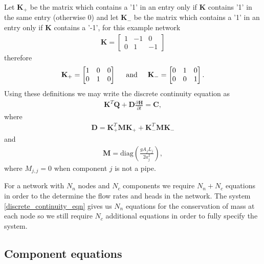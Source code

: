 \documentclass[12pt]{article}
\newcommand{\pardiv}[3]{\frac{\partial^{#1} #2}{\partial #3^{#1}}}
\begin{document}
Let $\mathbf{K}_+$ be the matrix which contains a '1' in an entry only if $\mathbf{K}$ contains '1' in the same entry (otherwise 0) and let $\mathbf{K}_-$ be the matrix which contains a '1' in an entry only if $\mathbf{K}$ contains a '-1', for this example network 
\begin{align*}
\mathbf{K} = \begin{bmatrix}
1 & -1 & 0 \\
0 & 1 & -1
\end{bmatrix}
\end{align*}
therefore
\begin{align*}
\mathbf{K}_+ = \begin{bmatrix}
1 & 0 & 0 \\
0 & 1 & 0
\end{bmatrix}
\hspace{0.5cm} \text{and} \hspace{0.5cm} \mathbf{K}_- = \begin{bmatrix}
0 & 1 & 0 \\
0 & 0 & 1
\end{bmatrix}.
\end{align*}
Using these definitions we may write the discrete continuity equation as 
\begin{align}\label{discrete_continuity_eqn}
\boxed{\mathbf{K}^T \mathbf{Q} + \mathbf{D} \pardiv{}{\mathbf{H}}{t} = \mathbf{C},}
\end{align}
where 
\begin{align*}
\mathbf{D} = \mathbf{K}_+^T \mathbf{M} \mathbf{K}_+ + \mathbf{K}_-^T \mathbf{M} \mathbf{K}_-
\end{align*}
and
\begin{align*}
\mathbf{M} = \text{diag}\left( \frac{gA_j L_j}{2 a_j^2}\right),
\end{align*}
{\color{red}where $M_{j,j} = 0$ when component $j$ is not a pipe.}

For a network with $N_n$ nodes and $N_c$ components we require $N_n + N_c$ equations in order to the determine the flow rates and heads in the network. The system \eqref{discrete_continuity_eqn} gives us $N_n$ equations for the conservation of mass at each node so we still require $N_c$ additional equations in order to fully specify the system. 

\subsection{Component equations}
\end{document}
